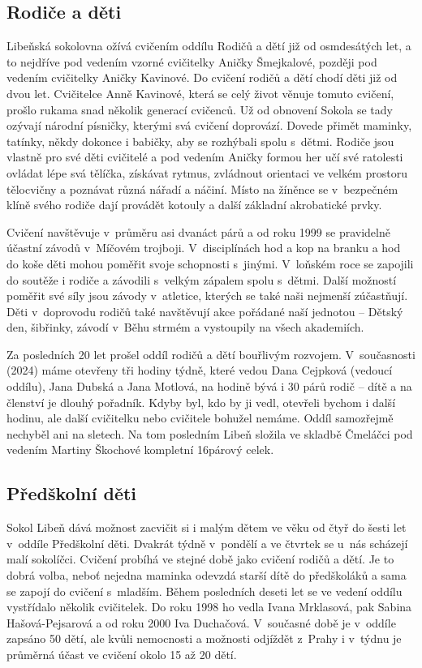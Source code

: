 \documentclass[a5paper, 12pt, twoside]{article}
\begin{document}
\subsection{Rodiče a děti}

Libeňská sokolovna ožívá cvičením oddílu Rodičů a dětí již od
osmdesátých let, a to nejdříve pod vedením vzorné cvičitelky Aničky
Šmejkalové, později pod vedením cvičitelky Aničky Kavinové. Do cvičení
rodičů a dětí chodí děti již od dvou let. Cvičitelce Anně Kavinové,
která se celý život věnuje tomuto cvičení, prošlo rukama snad několik
generací cvičenců. Už od obnovení Sokola se tady ozývají národní
písničky, kterými svá cvičení doprovází. Dovede přimět maminky, tatínky,
někdy dokonce i babičky, aby se rozhýbali spolu s~dětmi. Rodiče jsou
vlastně pro své děti cvičitelé a pod vedením Aničky formou her učí své
ratolesti ovládat lépe svá tělíčka, získávat rytmus, zvládnout orientaci
ve velkém prostoru tělocvičny a poznávat různá nářadí a náčiní. Místo na
žíněnce se v~bezpečném klíně svého rodiče dají provádět kotouly a další
základní akrobatické prvky.

Cvičení navštěvuje v~průměru asi dvanáct párů a od roku 1999 se
pravidelně účastní závodů v~Míčovém trojboji. V~disciplínách hod a kop
na branku a hod do koše děti mohou poměřit svoje schopnosti s~jinými.
V~loňském roce se zapojili do soutěže i rodiče a závodili s~velkým zápalem
spolu s~dětmi. Další možností poměřit své síly jsou závody v~atletice,
kterých se také naši nejmenší zúčastňují. Děti v~doprovodu rodičů také
navštěvují akce pořádané naší jednotou -- Dětský den, šibřinky, závodí
v~Běhu strmém a vystoupily na všech akademiích.

Za posledních 20 let prošel oddíl rodičů a dětí bouřlivým rozvojem.
V~současnosti (2024) máme otevřeny tři hodiny týdně, které vedou Dana
Cejpková (vedoucí oddílu), Jana Dubská a Jana Motlová, na hodině bývá i
30 párů rodič -- dítě a na členství je dlouhý pořadník. Kdyby byl, kdo
by ji vedl, otevřeli bychom i další hodinu, ale další cvičitelku nebo
cvičitele bohužel nemáme. Oddíl samozřejmě nechyběl ani na sletech. Na
tom posledním Libeň složila ve skladbě Čmeláčci pod vedením Martiny
Škochové kompletní 16párový celek.

\subsection{Předškolní děti}

Sokol Libeň dává možnost zacvičit si i malým dětem ve věku od čtyř do
šesti let v~oddíle Předškolní děti. Dvakrát týdně v~pondělí a ve čtvrtek
se u~nás scházejí malí sokolíčci. Cvičení probíhá ve stejné době jako
cvičení rodičů a dětí. Je to dobrá volba, neboť nejedna maminka odevzdá
starší dítě do předškoláků a sama se zapojí do cvičení s~mladším. Během
posledních deseti let se ve vedení oddílu vystřídalo několik cvičitelek.
Do roku 1998 ho vedla Ivana Mrklasová, pak Sabina Hašová-Pejsarová a od
roku 2000 Iva Duchačová. V~současné době je v~oddíle zapsáno 50 dětí,
ale kvůli nemocnosti a možnosti odjíždět z~Prahy i v~týdnu je průměrná
účast ve cvičení okolo 15 až 20 dětí.
\end{document}
